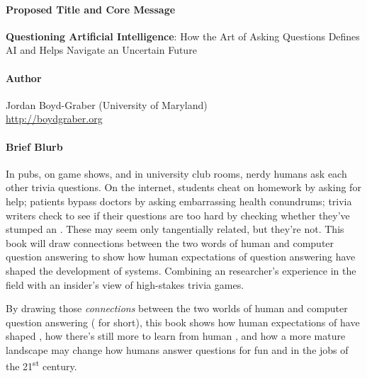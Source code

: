 
\clearpage

\paragraph{Proposed Title and Core Message} \hphantom{.} 

{\bf Questioning Artificial Intelligence}: How the Art of Asking Questions Defines AI and Helps Navigate an Uncertain Future



\vspace{3cm}

\paragraph{Author} Jordan Boyd-Graber (University of Maryland) \\

\url{http://boydgraber.org}

\paragraph{Brief Blurb}

In pubs, on game shows, and in university club rooms, nerdy humans ask
each other trivia questions. On the internet, students cheat on
homework by asking  for help; patients bypass doctors by
asking embarrassing health conundrums; trivia writers check to see if
their questions are too hard by checking whether they've stumped an
. These may seem only tangentially related, but they're not.
%
This book will draw connections between the two words of human and computer question answering to show how human expectations of question answering have shaped the development of  systems.
%
Combining an  researcher's experience in the field with an insider's view of high-stakes
trivia games.
%

By drawing those \emph{connections} between the two worlds of human
and computer question answering ( for short), this book shows how human
expectations of  have shaped , how there's still more
to learn from human , and how a more mature  landscape
may change how humans answer questions for fun and in the jobs of the
21\textsuperscript{st} century.

